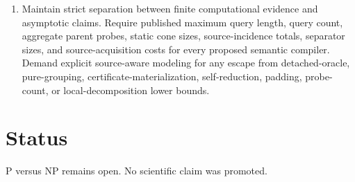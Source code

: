 \documentclass[11pt]{article}
\begin{document}
\begin{enumerate}
\item Maintain strict separation between finite computational evidence and asymptotic claims. Require published maximum query length, query count, aggregate parent probes, static cone sizes, source-incidence totals, separator sizes, and source-acquisition costs for every proposed semantic compiler. Demand explicit source-aware modeling for any escape from detached-oracle, pure-grouping, certificate-materialization, self-reduction, padding, probe-count, or local-decomposition lower bounds.
\end{enumerate}

\section{Status}
P versus NP remains open. No scientific claim was promoted.

\end{document}
